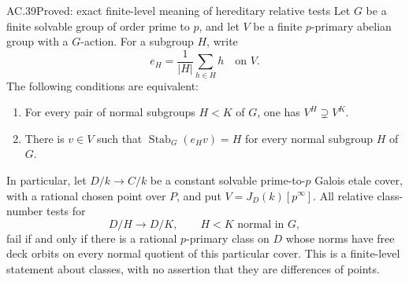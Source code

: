 \begin{claim}{AC.39}{Proved: exact finite-level meaning of hereditary relative tests}
Let \(G\) be a finite solvable group of order prime to \(p\),
and let \(V\) be a finite \(p\)-primary abelian group with a
\(G\)-action. For a subgroup \(H\), write
\[
                 e_H=\frac1{|H|}\sum_{h\in H}h
                      \quad\text{on }V.
\]
The following conditions are equivalent:
\begin{enumerate}
\item For every pair of normal subgroups \(H<K\) of \(G\),
      one has \(V^H\supsetneq V^K\).
\item There is \(v\in V\) such that
      \(\operatorname{Stab}_G(e_Hv)=H\) for every normal
      subgroup \(H\) of \(G\).
\end{enumerate}

In particular, let \(D/k\to C/k\) be a constant solvable
prime-to-\(p\) Galois etale cover, with a rational chosen
point over \(P\), and put \(V=J_D(k)[p^\infty]\).
All relative class-number tests for
\[
                    D/H\longrightarrow D/K,
                    \qquad H<K\text{ normal in }G,
\]
fail if and only if there is a rational \(p\)-primary
class on \(D\) whose norms have free deck orbits on
every normal quotient of this particular cover.
This is a finite-level statement about classes, with
no assertion that they are differences of points.
\end{claim}
